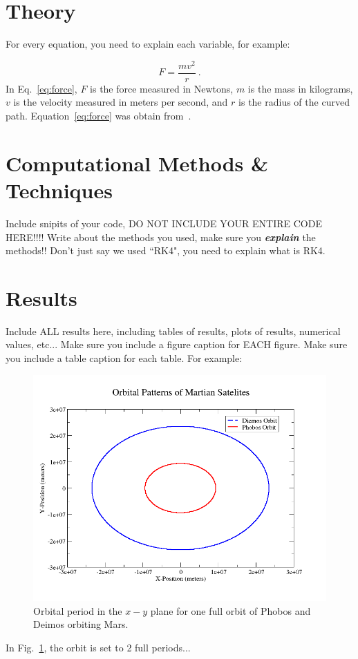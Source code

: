 \documentclass[11pt]{article}
\begin{document}
\section{Theory}
\noindent For every equation, you need to explain each variable, for example:

\begin{equation}
\label{eq:force}
F=\dfrac{mv^2}{r}~.
\end{equation}
\noindent In Eq.~\eqref{eq:force}, $F$ is the force measured in Newtons, $m$ is the
mass in kilograms, $v$ is the velocity measured in meters per second, and $r$ is
the radius of the curved path.  Equation~\eqref{eq:force} was obtain from~\cite{uni}.




\section{Computational Methods \& Techniques}
\noindent Include snipits of your code, DO NOT INCLUDE YOUR ENTIRE CODE HERE!!!!  
Write about the methods you used, make sure you \textbf{\textit{explain}} the methods!!  Don't
just say we used ``RK4", you need to explain what is RK4.

\section{Results}
\noindent Include ALL results here, including tables of results, plots of results, numerical values, etc...
Make sure you include a figure caption for EACH figure.  Make sure you include a table caption for each table.
For example:
\begin{figure}[ht]
\centering
\includegraphics[width=1.0\textwidth, angle =0]{../images/orbits}
\caption{Orbital period in the $x-y$ plane for one full orbit of Phobos and Deimos orbiting Mars.}
\label{fig:orbit-diagram}
\end{figure}
\noindent In Fig.~\ref{fig:orbit-diagram}, the orbit is set to 2 full periods...
\end{document}
